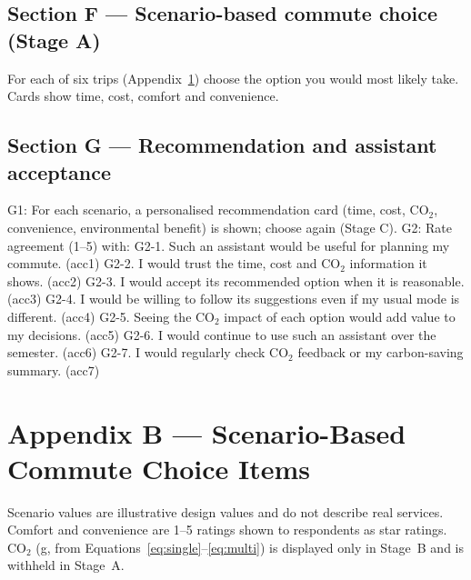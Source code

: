 \documentclass[11pt,a4paper]{article}
\begin{document}
\subsection*{Section F --- Scenario-based commute choice (Stage A)}
For each of six trips (Appendix~\ref{app:scenarios}) choose the option you would most likely take. Cards
show time, cost, comfort and convenience.

\subsection*{Section G --- Recommendation and assistant acceptance}
G1: For each scenario, a personalised recommendation card (time, cost, CO$_2$, convenience,
environmental benefit) is shown; choose again (Stage C). G2: Rate agreement (1--5) with: G2-1. Such an
assistant would be useful for planning my commute. (acc1) G2-2. I would trust the time, cost and CO$_2$
information it shows. (acc2) G2-3. I would accept its recommended option when it is reasonable. (acc3)
G2-4. I would be willing to follow its suggestions even if my usual mode is different. (acc4) G2-5.
Seeing the CO$_2$ impact of each option would add value to my decisions. (acc5) G2-6. I would continue
to use such an assistant over the semester. (acc6) G2-7. I would regularly check CO$_2$ feedback or my
carbon-saving summary. (acc7)

\section{Appendix B --- Scenario-Based Commute Choice Items}
\label{app:scenarios}

Scenario values are illustrative design values and do not describe real services. Comfort and
convenience are 1--5 ratings shown to respondents as star ratings. CO$_2$ (g, from
Equations~\ref{eq:single}--\ref{eq:multi}) is displayed only in Stage~B and is withheld in Stage~A.
\end{document}
